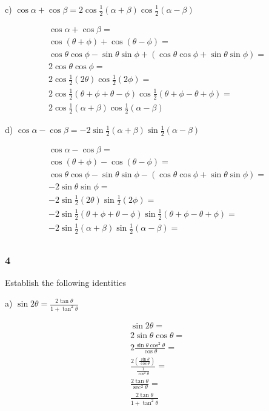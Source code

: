 \documentclass[]{report}
\begin{document}
c) $\cos\alpha +  \cos\beta = 2\cos\frac{1}{2}(\alpha + \beta)\cos\frac{1}{2}(\alpha - \beta)$

\begin{align*}
\cos\alpha +  \cos\beta = \\
\cos(\theta + \phi) +  \cos(\theta - \phi) = \\
\cos\theta\cos\phi - \sin\theta\sin\phi + (\cos\theta\cos\phi+ \sin\theta\sin\phi) = \\
2\cos\theta\cos\phi = \\
2\cos\frac{1}{2}(2\theta)\cos\frac{1}{2}(2\phi) = \\
2\cos\frac{1}{2}(\theta + \phi + \theta - \phi)\cos\frac{1}{2}(\theta + \phi - \theta + \phi) = \\
2\cos\frac{1}{2}(\alpha + \beta)\cos\frac{1}{2}(\alpha - \beta) 
\end{align*}

d) $\cos\alpha - \cos\beta = -2\sin\frac{1}{2}(\alpha + \beta)\sin\frac{1}{2}(\alpha - \beta)$

\begin{align*}
\cos\alpha - \cos\beta =\\
\cos(\theta + \phi) - \cos(\theta - \phi) = \\
\cos\theta\cos\phi - \sin\theta\sin\phi - (\cos\theta\cos\phi + \sin\theta\sin\phi) = \\
-2\sin\theta\sin\phi = \\
-2\sin\frac{1}{2}(2\theta)\sin\frac{1}{2}(2\phi) = \\
-2\sin\frac{1}{2}(\theta + \phi + \theta - \phi)\sin\frac{1}{2}(\theta + \phi - \theta + \phi) = \\
-2\sin\frac{1}{2}(\alpha + \beta)\sin\frac{1}{2}(\alpha - \beta) = \\
\end{align*}

\subsubsection{4}
Establish the following identities

a) $\sin2\theta = \frac{2\tan\theta}{1 + \tan^2\theta}$

\begin{align*} 
\sin2\theta = \\
2\sin\theta\cos\theta = \\
2\frac{\sin\theta\cos^2\theta}{\cos\theta} = \\
\frac{2(\frac{\sin\theta}{\cos\theta})}{\frac{1}{\cos^2\theta}} = \\
\frac{2\tan\theta}{\sec^2\theta} = \\
\frac{2\tan\theta}{1 + \tan^2\theta}
\end{align*}
\end{document}
